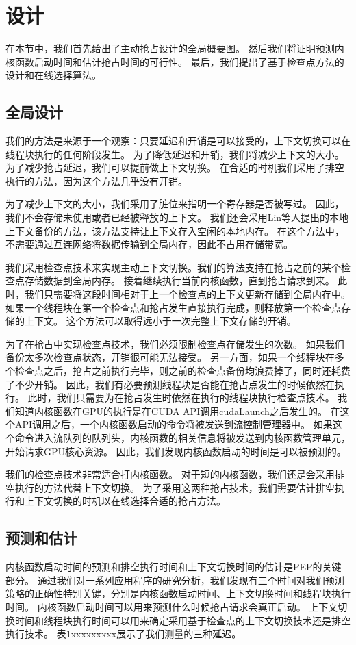 \section{设计}
在本节中，我们首先给出了主动抢占设计的全局概要图。
然后我们将证明预测内核函数启动时间和估计抢占时间的可行性。
最后，我们提出了基于检查点方法的设计和在线选择算法。

\subsection{全局设计}
我们的方法是来源于一个观察：只要延迟和开销是可以接受的，上下文切换可以在线程块执行的任何阶段发生。
为了降低延迟和开销，我们将减少上下文的大小。
为了减少抢占延迟，我们可以提前做上下文切换。
在合适的时机我们采用了排空执行的方法，因为这个方法几乎没有开销。

为了减少上下文的大小，我们采用了脏位来指明一个寄存器是否被写过。
因此，我们不会存储未使用或者已经被释放的上下文。
我们还会采用Lin等人提出的本地上下文备份的方法，该方法支持让上下文存入空闲的本地内存。
在这个方法中，不需要通过互连网络将数据传输到全局内存，因此不占用存储带宽。

我们采用检查点技术来实现主动上下文切换。我们的算法支持在抢占之前的某个检查点存储数据到全局内存。
接着继续执行当前内核函数，直到抢占请求到来。
此时，我们只需要将这段时间相对于上一个检查点的上下文更新存储到全局内存中。
如果一个线程块在第一个检查点和抢占发生直接执行完成，则释放第一个检查点存储的上下文。
这个方法可以取得远小于一次完整上下文存储的开销。

为了在抢占中实现检查点技术，我们必须限制检查点存储发生的次数。
如果我们备份太多次检查点状态，开销很可能无法接受。
另一方面，如果一个线程块在多个检查点之后，抢占之前执行完毕，则之前的检查点备份均浪费掉了，同时还耗费了不少开销。
因此，我们有必要预测线程块是否能在抢占点发生的时候依然在执行。
此时，我们只需要为在抢占发生时依然在执行的线程块执行检查点技术。
我们知道内核函数在GPU的执行是在CUDA API调用cudaLaunch之后发生的。
在这个API调用之后，一个内核函数启动的命令将被发送到流控制管理器中。
如果这个命令进入流队列的队列头，内核函数的相关信息将被发送到内核函数管理单元，开始请求GPU核心资源。
因此，我们发现内核函数启动的时间是可以被预测的。

我们的检查点技术非常适合打内核函数。
对于短的内核函数，我们还是会采用排空执行的方法代替上下文切换。
为了采用这两种抢占技术，我们需要估计排空执行和上下文切换的时机以在线选择合适的抢占方法。

\subsection{预测和估计}
内核函数启动时间的预测和排空执行时间和上下文切换时间的估计是PEP的关键部分。
通过我们对一系列应用程序的研究分析，我们发现有三个时间对我们预测策略的正确性特别关键，分别是内核函数启动时间、上下文切换时间和线程块执行时间。
内核函数启动时间可以用来预测什么时候抢占请求会真正启动。
上下文切换时间和线程块执行时间可以用来确定采用基于检查点的上下文切换技术还是排空执行技术。
表1xxxxxxxxx展示了我们测量的三种延迟。

